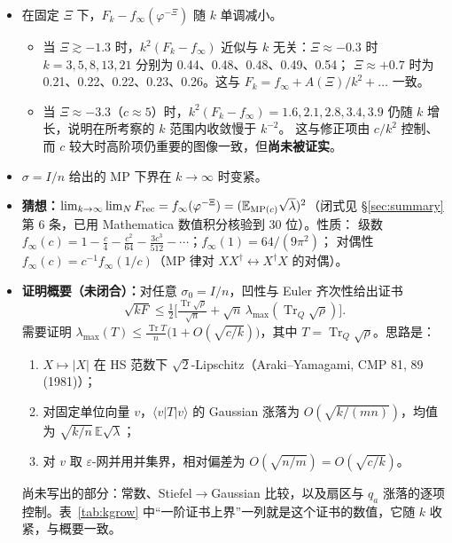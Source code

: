 \documentclass[11pt,a4paper,UTF8]{ctexart}
\newcommand{\Tr}{\operatorname{Tr}}
\newcommand{\E}{\mathbb{E}}
\newcommand{\Frec}{F_{\rm rec}}
\begin{document}
\begin{itemize}
  \item 在固定 $\Xi$ 下，$F_k-f_\infty(\varphi^{-\Xi})$ 随 $k$ 单调减小。
  \begin{itemize}
    \item 当 $\Xi\gtrsim-1.3$ 时，$k^2(F_k-f_\infty)$ 近似与 $k$ 无关：$\Xi\approx-0.3$ 时 $k=3,5,8,13,21$ 分别为 0.44、0.48、0.48、0.49、0.54；
    $\Xi\approx+0.7$ 时为 0.21、0.22、0.22、0.23、0.26。这与 $F_k=f_\infty+A(\Xi)/k^2+\dots$ 一致。
    \item 当 $\Xi\approx-3.3$（$c\approx5$）时，$k^2(F_k-f_\infty)=1.6,2.1,2.8,3.4,3.9$ 仍随 $k$ 增长，说明在所考察的 $k$ 范围内收敛慢于 $k^{-2}$。
    这与修正项由 $c/k^2$ 控制、而 $c$ 较大时高阶项仍重要的图像一致，但\textbf{尚未被证实}。
  \end{itemize}
  \item $\sigma=I/n$ 给出的 MP 下界在 $k\to\infty$ 时变紧。
  \item \textbf{猜想：}$\lim_{k\to\infty}\lim_N\Frec=f_\infty(\varphi^{-\Xi})=(\E_{{\rm MP}(c)}\sqrt\lambda)^2$（闭式见 \S\ref{sec:summary} 第 6 条，已用 Mathematica 数值积分核验到 30 位）。性质：
  级数 $f_\infty(c)=1-\frac c4-\frac{c^2}{64}-\frac{3c^3}{512}-\cdots$；$f_\infty(1)=64/(9\pi^2)$；
  对偶性 $f_\infty(c)=c^{-1}f_\infty(1/c)$（MP 律对 $XX^\dagger\leftrightarrow X^\dagger X$ 的对偶）。
  \item \textbf{证明概要（未闭合）：}对任意 $\sigma_0=I/n$，凹性与 Euler 齐次性给出证书
  \[
  \sqrt{kF}\le\tfrac12\Big[\tfrac{\Tr\sqrt\rho}{\sqrt n}+\sqrt n\,\lambda_{\max}(\Tr_Q\sqrt\rho)\Big].
  \]
  需要证明 $\lambda_{\max}(T)\le\frac{\Tr T}{n}\big(1+O(\sqrt{c/k})\big)$，其中 $T=\Tr_Q\sqrt\rho$。思路是：
  \begin{enumerate}
    \item $X\mapsto|X|$ 在 HS 范数下 $\sqrt2$-Lipschitz（Araki--Yamagami, CMP 81, 89 (1981)）；
    \item 对固定单位向量 $v$，$\langle v|T|v\rangle$ 的 Gaussian 涨落为 $O(\sqrt{k/(mn)})$，均值为 $\sqrt{k/n}\,\E\sqrt\lambda$；
    \item 对 $v$ 取 $\varepsilon$-网并用并集界，相对偏差为 $O(\sqrt{n/m})=O(\sqrt{c/k})$。
  \end{enumerate}
  尚未写出的部分：常数、Stiefel$\to$Gaussian 比较，以及扇区与 $q_a$ 涨落的逐项控制。表~\ref{tab:kgrow} 中“一阶证书上界”一列就是这个证书的数值，它随 $k$ 收紧，与概要一致。
\end{itemize}

\end{document}
